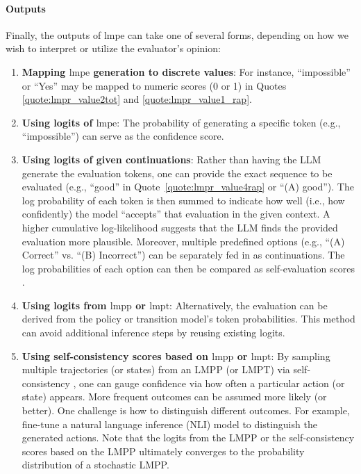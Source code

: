 \paragraph{Outputs}
Finally, the outputs of $\text{lmpe}$ can take one of several forms, depending on how we wish to interpret or utilize the evaluator’s opinion:

\begin{enumerate}
    \item \textbf{Mapping $\text{lmpe}$ generation to discrete values}: 
    For instance, ``impossible'' or ``Yes'' may be mapped to numeric scores (0 or 1) in Quotes \ref{quote:lmpr_value2tot} and \ref{quote:lmpr_value1_rap}.
    
    \item \textbf{Using logits of $\text{lmpe}$}:
    The probability of generating a specific token (e.g., ``impossible'') can serve as the confidence score.

    \item \textbf{Using logits of given continuations}:
    Rather than having the LLM generate the evaluation tokens, one can provide the exact sequence to be evaluated (e.g., “good” in Quote~\ref{quote:lmpr_value4rap} or “(A) good”). The log probability of each token is then summed to indicate how well (i.e., how confidently) the model ``accepts'' that evaluation in the given context. 
    A higher cumulative log-likelihood suggests that the LLM finds the provided evaluation more plausible.
    Moreover, multiple predefined options (e.g., ``(A) Correct'' vs. ``(B) Incorrect'') can be separately fed in as continuations. The log probabilities of each option can then be compared as self-evaluation scores \citep{xie2023selfevaluation,Kadavath2022selfeval}.
    
    \item \textbf{Using logits from $\text{lmpp}$ or $\text{lmpt}$}: 
    Alternatively, the evaluation can be derived from the policy or transition model’s token probabilities. This method can avoid additional inference steps by reusing existing logits. 

    \item \textbf{Using self-consistency scores based on $\text{lmpp}$ or $\text{lmpt}$}:
    By sampling multiple trajectories (or states) from an LMPP (or LMPT) via self-consistency \citep{wang2023selfconsistency}, one can gauge confidence via how often a particular action (or state) appears. More frequent outcomes can be assumed more likely (or better). 
    One challenge is how to distinguish different outcomes.
    For example, \citet{zhuang2024toolchain} fine-tune a natural language inference (NLI) model to distinguish the generated actions.
    Note that the logits from the LMPP or the self-consistency scores based on the LMPP ultimately converges to the probability distribution of a stochastic LMPP.
    

\end{enumerate}
